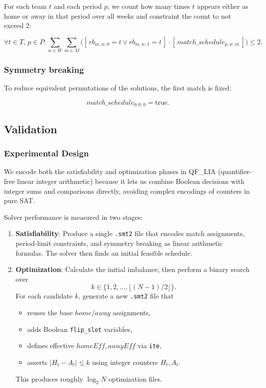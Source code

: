 For each team $t$ and each period $p$, we count how many times $t$ appears either as home or away in that period over all weeks and constraint the count to not exceed 2:

\[
\forall t \in T,\, p \in P: 
\sum_{w \in W} \sum_{m \in M} 
\big(
[\,rb_{m,w,0} = t \lor rb_{m,w,1} = t\,] \cdot [\,match\_schedule_{p,w,m}\,]
\big) \leq 2.
\]

\subsubsection{Symmetry breaking}

To reduce equivalent permutations of the solutions, the first match is fixed:

\[
match\_schedule_{0,0,0} = \text{true}.
\]

\subsection{Validation}

\subsubsection{Experimental Design}
We encode both the satisfiability and optimization phases in QF\_LIA (quantifier-free linear integer arithmetic) because it lets us combine Boolean decisions with integer sums and comparisons directly, avoiding complex encodings of counters in pure SAT.

Solver performance is measured in two stages:
\begin{enumerate}
  \item \textbf{Satisfiability}: Produce a single \texttt{.smt2} file that encodes match assignments, period-limit constraints, and symmetry breaking as linear arithmetic formulas. The solver then finds an initial feasible schedule.
  \item \textbf{Optimization}: Calculate the initial imbalance, then perform a binary search over 
  \[
    k \in \{1,2,\dots,\lfloor(N-1)/2\rfloor\}.
  \]
  For each candidate \(k\), generate a new \texttt{.smt2} file that
  \begin{itemize}
    \item reuses the base \(home/away\) assignments,
    \item adds Boolean \texttt{flip\_slot} variables,
    \item defines effective \(homeEff,awayEff\) via \texttt{ite},
    \item asserts \(\lvert H_t - A_t\rvert \le k\) using integer counters \(H_t,A_t\).
  \end{itemize}
  This produces roughly \(\log_2 N\) optimization files.
\end{enumerate}

